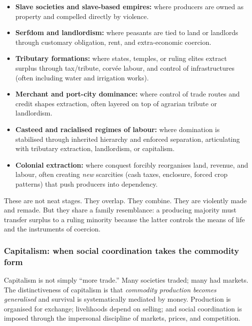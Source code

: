 \begin{itemize}[leftmargin=1.5em]
  \item \textbf{Slave societies and slave-based empires:} where producers are owned as property and compelled directly by violence.
  \item \textbf{Serfdom and landlordism:} where peasants are tied to land or landlords through customary obligation, rent, and extra-economic coercion.
  \item \textbf{Tributary formations:} where states, temples, or ruling elites extract surplus through tax/tribute, corvée labour,
        and control of infrastructures (often including water and irrigation works).
  \item \textbf{Merchant and port-city dominance:} where control of trade routes and credit shapes extraction, often layered on top of agrarian tribute or landlordism.
  \item \textbf{Casteed and racialised regimes of labour:} where domination is stabilised through inherited hierarchy and enforced separation,
        articulating with tributary extraction, landlordism, or capitalism.
  \item \textbf{Colonial extraction:} where conquest forcibly reorganises land, revenue, and labour, often creating \emph{new} scarcities
        (cash taxes, enclosure, forced crop patterns) that push producers into dependency.\cite{Marx1867}
\end{itemize}

These are not neat stages. They overlap. They combine. They are violently made and remade. But they share a family resemblance:
a producing majority must transfer surplus to a ruling minority because the latter controls the means of life and the instruments of coercion.

\subsubsection{Capitalism: when social coordination takes the commodity form}
\label{sec:capitalism-commodityform}

Capitalism is not simply ``more trade.'' Many societies traded; many had markets. The distinctiveness of capitalism is that
\emph{commodity production becomes generalised} and survival is systematically mediated by money. Production is organised for
exchange; livelihoods depend on selling; and social coordination is imposed through the impersonal discipline of markets, prices,
and competition.

